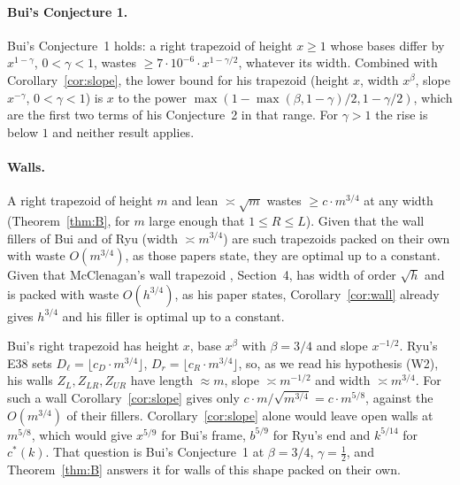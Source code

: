 \documentclass[11pt,letterpaper]{amsart}
\theoremstyle{plain}
\theoremstyle{definition}
\theoremstyle{remark}
\newcommand{\cs}{c^{*}}
\begin{document}
\paragraph{Bui's Conjecture 1.}
Bui's Conjecture~1 \cite{Bui25} holds: a right trapezoid of height $x\ge1$ whose bases differ by $x^{1-\gamma}$, $0<\gamma<1$, wastes $\ge7\cdot10^{-6}\cdot x^{1-\gamma/2}$, whatever its width. Combined with Corollary~\ref{cor:slope}, the lower bound for his trapezoid (height $x$, width $x^\beta$, slope $x^{-\gamma}$, $0<\gamma<1$) is $x$ to the power $\max(1-\max(\beta,1-\gamma)/2,1-\gamma/2)$, which are the first two terms of his Conjecture~2 in that range. For $\gamma>1$ the rise is below $1$ and neither result applies.

\paragraph{Walls.}
A right trapezoid of height $m$ and lean $\asymp\sqrt m$ wastes $\ge c\cdot m^{3/4}$ at any width (Theorem~\ref{thm:B}, for $m$ large enough that $1\le R\le L$). Given that the wall fillers of Bui \cite{Bui25} and of Ryu \cite{Ryu26} (width $\asymp m^{3/4}$) are such trapezoids packed on their own with waste $O(m^{3/4})$, as those papers state, they are optimal up to a constant. Given that McClenagan's wall trapezoid \cite{McC26}, Section~4, has width of order $\sqrt h$ and is packed with waste $O(h^{3/4})$, as his paper states, Corollary~\ref{cor:wall} already gives $h^{3/4}$ and his filler is optimal up to a constant.

Bui's right trapezoid has height $x$, base $x^\beta$ with $\beta=3/4$ and slope $x^{-1/2}$. Ryu's E38 sets $D_\ell=\lfloor c_D\cdot m^{3/4}\rfloor$, $D_r=\lfloor c_R\cdot m^{3/4}\rfloor$, so, as we read his hypothesis (W2), his walls $Z_L,Z_{LR},Z_{UR}$ have length $\approx m$, slope $\asymp m^{-1/2}$ and width $\asymp m^{3/4}$. For such a wall Corollary~\ref{cor:slope} gives only $c\cdot m/\sqrt{m^{3/4}}=c\cdot m^{5/8}$, against the $O(m^{3/4})$ of their fillers. Corollary~\ref{cor:slope} alone would leave open walls at $m^{5/8}$, which would give $x^{5/9}$ for Bui's frame, $b^{5/9}$ for Ryu's end and $k^{5/14}$ for $\cs(k)$. That question is Bui's Conjecture~1 at $\beta=3/4$, $\gamma=\tfrac12$, and Theorem~\ref{thm:B} answers it for walls of this shape packed on their own.
\end{document}
